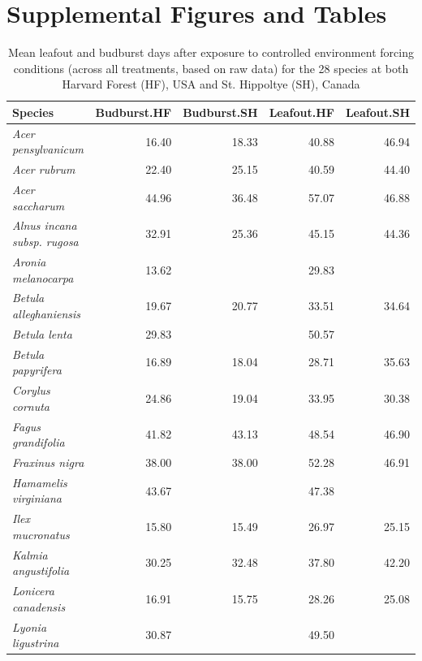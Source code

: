 \documentclass{article}
\begin{document}



\newpage
\section*{Supplemental Figures and Tables}

\begin{table}[ht]
\centering
\caption{Mean leafout and budburst days after exposure to controlled environment forcing conditions (across all treatments, based on raw data) for the 28 species at both Harvard Forest (HF), USA and St. Hippoltye (SH), Canada} 
\begin{tabular}{lrrrr}
  \hline
Species & Budburst.HF & Budburst.SH & Leafout.HF & Leafout.SH \\ 
  \hline
\textit{Acer pensylvanicum} & 16.40 & 18.33 & 40.88 & 46.94 \\ 
  \textit{Acer rubrum} & 22.40 & 25.15 & 40.59 & 44.40 \\ 
  \textit{Acer saccharum} & 44.96 & 36.48 & 57.07 & 46.88 \\ 
  \textit{Alnus incana subsp. rugosa} & 32.91 & 25.36 & 45.15 & 44.36 \\ 
  \textit{Aronia melanocarpa} & 13.62 &  & 29.83 &  \\ 
  \textit{Betula alleghaniensis} & 19.67 & 20.77 & 33.51 & 34.64 \\ 
  \textit{Betula lenta} & 29.83 &  & 50.57 &  \\ 
  \textit{Betula papyrifera} & 16.89 & 18.04 & 28.71 & 35.63 \\ 
  \textit{Corylus cornuta} & 24.86 & 19.04 & 33.95 & 30.38 \\ 
  \textit{Fagus grandifolia} & 41.82 & 43.13 & 48.54 & 46.90 \\ 
  \textit{Fraxinus nigra} & 38.00 & 38.00 & 52.28 & 46.91 \\ 
  \textit{Hamamelis virginiana} & 43.67 &  & 47.38 &  \\ 
  \textit{Ilex mucronatus} & 15.80 & 15.49 & 26.97 & 25.15 \\ 
  \textit{Kalmia angustifolia} & 30.25 & 32.48 & 37.80 & 42.20 \\ 
  \textit{Lonicera canadensis} & 16.91 & 15.75 & 28.26 & 25.08 \\ 
  \textit{Lyonia ligustrina} & 30.87 &  & 49.50 &  \\ 

\end{tabular}
\end{table}
\end{document}
